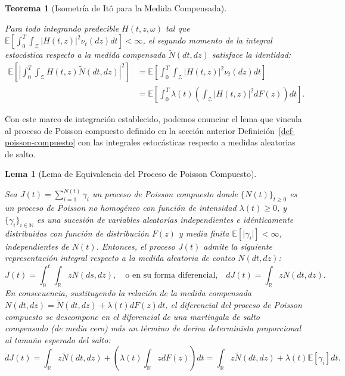 \documentclass[
  spanish,
  us-letterpaper,
]{scrreprt}
\numberwithin{equation}{section}
\theoremstyle{plain}
\newtheorem{theorem}{Teorema}[chapter]
\theoremstyle{plain}
\theoremstyle{definition}
\theoremstyle{plain}
\newtheorem{lemma}{Lema}[chapter]
\theoremstyle{remark}
\begin{document}
\begin{theorem}[Isometría de Itô para la Medida
Compensada]\protect\hypertarget{thm-isometria-saltos}{}\label{thm-isometria-saltos}

Para todo integrando predecible \(H(t, z, \omega)\) tal que
\(\mathbb{E} \left[ \displaystyle \int_0^T \int_{\mathcal{Z}} \vert H(t, z) \vert^2 \nu_t(dz) dt \right] < \infty\),
el segundo momento de la integral estocástica respecto a la medida
compensada \(\tilde{N}(dt, dz)\) satisface la identidad: \[
\begin{aligned}
\mathbb{E}\left[ \left\vert \int_0^T \int_{\mathcal{Z}} H(t, z) \tilde{N}(dt, dz) \right\vert^2 \right] &= \mathbb{E}\left[ \int_0^T \int_{\mathcal{Z}} \vert H(t, z) \vert^2 \nu_t(dz) dt \right] \\
&= \mathbb{E}\left[ \int_0^T \lambda(t) \left( \int_{\mathcal{Z}} \vert H(t, z) \vert^2 dF(z) \right) dt \right].
\end{aligned}
\]

\end{theorem}

Con este marco de integración establecido, podemos enunciar el lema que
vincula al proceso de Poisson compuesto definido en la sección anterior
Definición~\ref{def-poisson-compuesto} con las integrales estocásticas
respecto a medidas aleatorias de salto.

\begin{lemma}[Lema de Equivalencia del Proceso de Poisson
Compuesto]\protect\hypertarget{lem-equivalencia-saltos}{}\label{lem-equivalencia-saltos}

Sea \(\displaystyle J(t) = \sum_{i=1}^{N(t)} \gamma_i\) un proceso de
Poisson compuesto donde \(\displaystyle \{N(t)\}_{t \ge 0}\) es un
proceso de Poisson no homogéneo con función de intensidad
\(\lambda(t) \ge 0\), y \(\{\gamma_i\}_{i \in \mathbb{N}}\) es una
sucesión de variables aleatorias independientes e idénticamente
distribuidas con función de distribución \(F(z)\) y media finita
\(\mathbb{E}[\vert \gamma_i \vert] < \infty\), independientes de
\(N(t)\). Entonces, el proceso \(J(t)\) admite la siguiente
representación integral respecto a la medida aleatoria de conteo
\(N(dt, dz)\): \[
J(t) = \int_0^t \int_{\mathbb{R}} z N(ds, dz), \quad \text{o en su forma diferencial,} \quad dJ(t) = \int_{\mathbb{R}} z N(dt, dz).
\] En consecuencia, sustituyendo la relación de la medida compensada
\(N(dt, dz) = \tilde{N}(dt, dz) + \lambda(t)dF(z)dt\), el diferencial
del proceso de Poisson compuesto se descompone en el diferencial de una
martingala de salto compensado (de media cero) más un término de deriva
determinista proporcional al tamaño esperado del salto: \[
dJ(t) = \int_{\mathbb{R}} z \tilde{N}(dt, dz) + \left( \lambda(t) \int_{\mathbb{R}} z dF(z) \right) dt = \int_{\mathbb{R}} z \tilde{N}(dt, dz) + \lambda(t) \mathbb{E}[\gamma_i] dt.
\]

\end{lemma}
\end{document}
